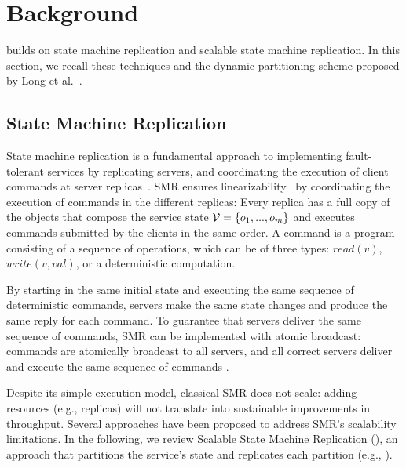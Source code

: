 \section{Background}
\label{sec:background}

\dynastar builds on state machine replication and scalable state machine replication.
In this section, we recall these techniques and the dynamic partitioning scheme proposed by Long et al.~\cite{hoang2016}.


\subsection{State Machine Replication}
\label{sec:smr}

State machine replication is a fundamental approach to implementing fault-tolerant services by replicating servers, and coordinating the execution of client commands at server replicas~\cite{Lam78,Sch90}. 
SMR ensures linearizability~\cite{Attiya04} by coordinating the execution of commands in the different replicas: 
Every replica has a full copy of the objects that compose the service state $\mathcal{V} = \{o_1, ..., o_m\}$ and executes commands submitted by the clients in the same order. 
A command is a program consisting of a sequence of operations, which can be of three types: $read(v)$, $write(v, val)$, or a deterministic computation.

By starting in the same initial state and executing the same sequence of deterministic commands, servers make the same state changes and produce the same reply for each command. To guarantee that servers deliver the same sequence of commands, SMR can be implemented with atomic broadcast: commands are atomically broadcast to all servers, and all correct servers deliver and execute the same sequence of commands \cite{BJ87b,DSU04}.

Despite its simple execution model, classical SMR does not scale: adding resources (e.g., replicas) will not translate into sustainable improvements in throughput. 
%
Several approaches have been proposed to address SMR's scalability limitations. 
In the following, we review Scalable State Machine Replication (\ssmr), an approach that partitions the service's state and replicates each partition (e.g., \cite{Glendenning:2011kj,Marandi:2011dj,hoang2016}).


